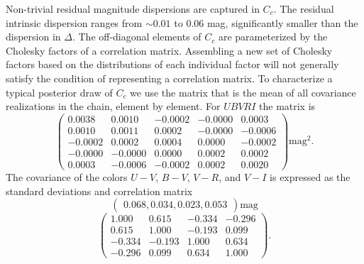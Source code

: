 \documentclass{aastex61}   	%
\begin{document}
Non-trivial residual magnitude dispersions are captured in $C_c$.
The residual intrinsic dispersion ranges from
$\sim 0.01$ to 0.06 mag, significantly smaller
than the dispersion in $\Delta$.
The off-diagonal elements of $C_c$ are parameterized by the Cholesky factors of a correlation matrix.
Assembling
a new set of Cholesky factors based on the distributions of each individual factor will not generally satisfy the condition of representing a correlation matrix.  
To characterize a typical posterior draw of $C_c$ we use the matrix that is the mean of all covariance realizations in the
chain, element by element.
For $UBVRI$ the matrix is
\begin{equation}
\begin{pmatrix}
0.0038 & 0.0010 & -0.0002 & -0.0000 & 0.0003 \\
0.0010 & 0.0011 & 0.0002 & -0.0000 & -0.0006 \\
-0.0002 & 0.0002 & 0.0004 & 0.0000 & -0.0002 \\
-0.0000 & -0.0000 & 0.0000 & 0.0002 & 0.0002 \\
0.0003 & -0.0006 & -0.0002 & 0.0002 & 0.0020
 \end{pmatrix} \text{mag}^2.
 \label{mag_cov:eqn}
 \end{equation}
The  covariance of the colors $U-V$, $B-V$, $V-R$, and $V-I$ is
expressed as the standard deviations and
 correlation matrix
 \begin{equation}
 \begin{pmatrix}
0.068 , 0.034 , 0.023 , 0.053
  \end{pmatrix} \text{mag}
 \label{color_sd:eqn}
   \end{equation}
 \begin{equation}
\begin{pmatrix}
1.000 & 0.615 & -0.334 & -0.296 \\
0.615 & 1.000 & -0.193 & 0.099 \\
-0.334 & -0.193 & 1.000 & 0.634 \\
-0.296 & 0.099 & 0.634 & 1.000  \end{pmatrix}.
  \label{color_cor:eqn}
 \end{equation}
 
\end{document}
